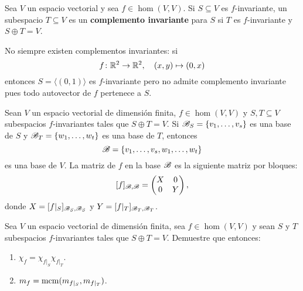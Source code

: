 \begin{block}
	Sea $V$ un espacio vectorial y sea $f\in\hom(V,V)$. Si $S\subseteq V$ es
	$f$-invariante, un subespacio $T\subseteq V$ es un \textbf{complemento
	invariante} para $S$ si $T$ es $f$-invariante y $S\oplus T=V$. 
\end{block}

\begin{example}
	No siempre existen complementos invariantes: si
	\[
		f\colon\mathbb{R}^2\to\mathbb{R}^2,\quad
		(x,y)\mapsto (0,x)
	\]
	entonces $S=\langle(0,1)\rangle$ es $f$-invariante pero no admite
	complemento invariante pues todo autovector de $f$ pertenece a $S$.
\end{example}

\begin{block}
	\label{block:XY}
	Sean $V$ un espacio vectorial de dimensión finita, $f\in\hom(V,V)$ y
	$S,T\subseteq V$ subespacios $f$-invariantes tales que $S\oplus T=V$. Si
	$\mathscr{B}_S=\{v_1,\dots,v_s\}$ es una base de $S$ y $\mathscr{B}_T=\{w_1,\dots,w_t\}$ es
	una base de $T$, entonces 
	\[
	\mathscr{B}=\{v_1,\dots,v_s,w_1,\dots,w_t\}
	\]
	es una base de $V$. La matriz de $f$ en la base $\mathscr{B}$ es la siguiente
	matriz por bloques:
	\[
		[f]_{\mathscr{B},\mathscr{B}}=\begin{pmatrix}
			X & 0\\
			0 & Y
		\end{pmatrix},
	\]
	donde $X=[f|_S]_{\mathscr{B}_S,\mathscr{B}_S}$ y $Y=[f|_T]_{\mathscr{B}_T,\mathscr{B}_T}$. 
\end{block}

\begin{xca}
    \label{xca:f_invariante}
    Sea $V$ un espacio vectorial de dimensión finita, sea $f\in\hom(V,V)$ y 
    sean $S$ y $T$ subespacios $f$-invariantes tales que $S\oplus T=V$.
    Demuestre que entonces:
	\begin{enumerate}
		\item $\chi_f=\chi_{f|_S}\chi_{f|_T}$. 
		\item $m_f=\mathrm{mcm}(m_{f|_S},m_{f|_T})$.
	\end{enumerate}
%
\end{xca}


